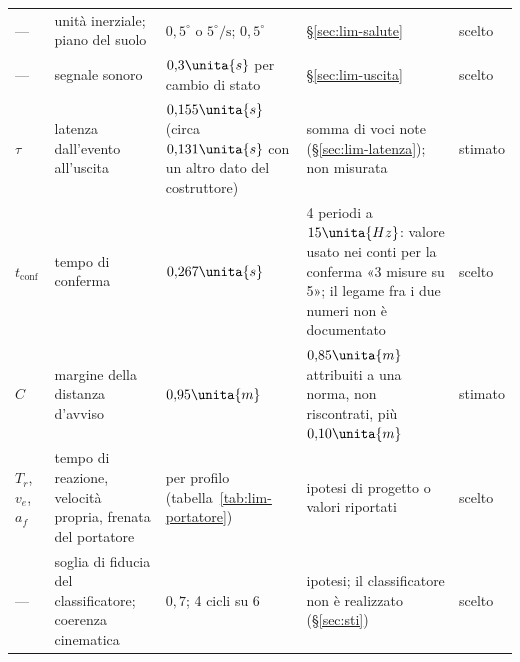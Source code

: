 \begin{table}[H]
\begin{tabularx}{\linewidth}{@{}p{1.25cm}Lp{3.5cm}Lp{1.2cm}@{}}
--- & unità inerziale; piano del suolo & $0{,}5^\circ$ o $5^\circ/\mathrm{s}$; $0{,}5^\circ$ & \S\ref{sec:lim-salute} & scelto\\
--- & segnale sonoro & $0{,}3\unita{s}$ per cambio di stato & \S\ref{sec:lim-uscita} & scelto\\
$\tau$ & latenza dall'evento all'uscita & $0{,}155\unita{s}$ (circa $0{,}131\unita{s}$ con un altro dato del costruttore) & somma di voci note (\S\ref{sec:lim-latenza}); non misurata & stimato\\
$t_{\mathrm{conf}}$ & tempo di conferma & $0{,}267\unita{s}$ & 4 periodi a $15\unita{Hz}$: valore usato nei conti per la conferma «3 misure su 5»; il legame fra i due numeri non è documentato & scelto\\
$C$ & margine della distanza d'avviso & $0{,}95\unita{m}$ & $0{,}85\unita{m}$ attribuiti a una norma, non riscontrati, più $0{,}10\unita{m}$ & stimato\\
$T_r$, $v_e$, $a_f$ & tempo di reazione, velocità propria, frenata del portatore & per profilo (tabella~\ref{tab:lim-portatore}) & ipotesi di progetto o valori riportati & scelto\\
--- & soglia di fiducia del classificatore; coerenza cinematica & $0{,}7$; 4 cicli su 6 & ipotesi; il classificatore non è realizzato (\S\ref{sec:sti}) & scelto\\
\bottomrule
\end{tabularx}
\end{table}
